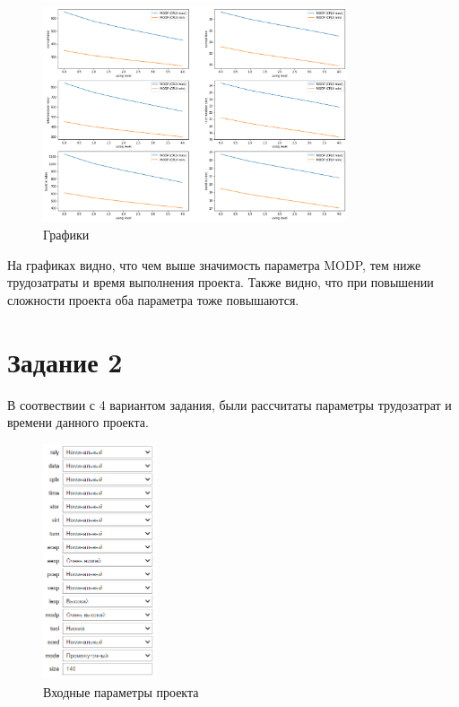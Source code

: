 \begin{figure}[H]
	\centering
	\includegraphics[width=0.8\textwidth]{img/content/task_01.png}
	\caption{Графики}
	\label{fig:task_01}
\end{figure}

На графиках видно, что чем выше значимость параметра MODP, тем ниже трудозатраты и время выполнения проекта. Также видно, что при повышении сложности проекта оба параметра тоже повышаются.

\section{Задание 2}

В соотвествии с 4 вариантом задания, были рассчитаты параметры трудозатрат и времени данного проекта.

\begin{figure}[H]
	\centering
	\includegraphics[width=0.3\textwidth]{img/content/task_02_params.png}
	\caption{Входные параметры проекта}
	\label{fig:task_02_params}
\end{figure}


